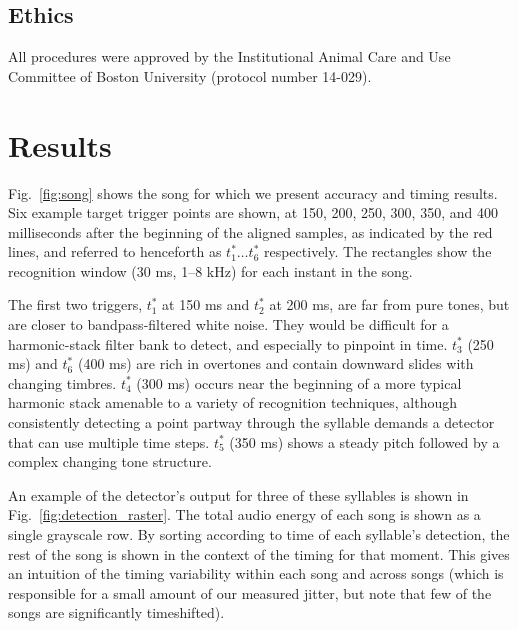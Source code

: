 \documentclass[10pt,letterpaper]{article}
\newcommand\fig[1]{Fig.~\ref{#1}}
\begin{document}
\subsection{Ethics}

All procedures were approved by the Institutional Animal Care and Use
Committee of Boston University (protocol number 14-029).

\section{Results}
\label{sec:results}

\fig{fig:song} shows the song for which we present accuracy and timing
results.  Six example target trigger points are shown, at 150, 200,
250, 300, 350, and 400 milliseconds after the beginning of the aligned
samples, as indicated by the red lines, and referred to henceforth as
$t^*_1\ldots t^*_6$ respectively.  The rectangles show the recognition
window (30 ms, 1--8 kHz) for each instant in the song.

The first two triggers, $t^*_1$ at 150 ms and $t^*_2$ at 200 ms, are
far from pure tones, but are closer to bandpass-filtered white noise.  They would be
difficult for a harmonic-stack filter bank to detect, and especially
to pinpoint in time.  $t^*_3$ (250 ms) and $t^*_6$ (400 ms) are rich
in overtones and contain downward slides with changing timbres.
$t^*_4$ (300 ms) occurs near the beginning of a more typical harmonic
stack amenable to a variety of recognition techniques, although
consistently detecting a point partway through the syllable demands a
detector that can use multiple time steps.  $t^*_5$ (350 ms) shows a
steady pitch followed by a complex changing tone structure.

An example of the detector's output for three of these syllables is
shown in \fig{fig:detection_raster}.  The total audio energy of each
song is shown as a single grayscale row.  By sorting according to time
of each syllable's detection, the rest of the song is shown in the
context of the timing for that moment.  This gives an intuition of the
timing variability within each song and across songs (which is
responsible for a small amount of our measured jitter, but note that few of the songs are significantly timeshifted).
\end{document}
